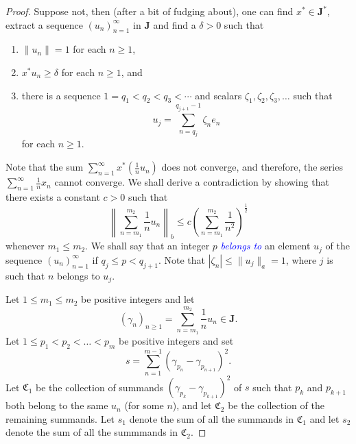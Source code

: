 \documentclass[11pt]{article}
\theoremstyle{thmstyle}
\theoremstyle{defstyle}
\newcommand{\define}[1]{\textcolor{blue}{\textit{#1}}}
\renewcommand{\le}{\leqslant}
\renewcommand{\ge}{\geqslant}
\newcommand{\bfJ}{\mathbf{J}}
\begin{document}
\begin{proof}
	Suppose not, then (after a bit of fudging about), one can find $x^\ast\in \bfJ^\ast$, extract a sequence $(u_n)_{n = 1}^\infty$ in $\bfJ$ and find a $\delta > 0$ such that 
	\begin{enumerate}[label=(\roman*)]
		\item $\|u_n\| = 1$ for each $n\ge 1$, 
		\item $x^\ast u_n\ge\delta$ for each $n\ge 1$, and 
		\item there is a sequence $1 = q_1 < q_2 < q_3 < \cdots$ and scalars $\zeta_1, \zeta_2, \zeta_3,\dots$ such that 
		\begin{equation*}
			u_j = \sum_{n = q_j}^{q_{j + 1} - 1}\zeta_n e_n
		\end{equation*}
		for each $n\ge 1$.
	\end{enumerate}
	Note that the sum $\displaystyle\sum_{n = 1}^\infty x^\ast\left(\frac{1}{n}u_n\right)$ does not converge, and therefore, the series $\displaystyle\sum_{n = 1}^\infty\frac{1}{n}x_n$ cannot converge. We shall derive a contradiction by showing that there exists a constant $c > 0$ such that 
	\begin{equation*}
		\left\|\sum_{n = m_1}^{m_2}\frac{1}{n}u_n\right\|_b\le c\left(\sum_{n = m_1}^{m_2}\frac{1}{n^2}\right)^{\frac{1}{2}}
	\end{equation*}
	whenever $m_1\le m_2$. We shall say that an integer $p$ \define{belongs to} an element $u_j$ of the sequence $(u_n)_{n = 1}^\infty$ if $q_j\le p < q_{j + 1}$. Note that $|\zeta_n|\le \|u_j\|_a = 1$, where $j$ is such that $n$ belongs to $u_j$. 

	Let $1\le m_1\le m_2$ be positive integers and let 
	\begin{equation*}
		(\gamma_n)_{n\ge 1} = \sum_{n = m_1}^{m_2}\frac{1}{n}u_n\in\bfJ.
	\end{equation*}
	Let $1\le p_1 < p_2 < \dots < p_m$ be positive integers and set 
	\begin{equation*}
		s = \sum_{n = 1}^{m - 1}\left(\gamma_{p_n} - \gamma_{p_{n + 1}}\right)^2.
	\end{equation*}
	Let $\mathfrak{C}_1$ be the collection of summands $(\gamma_{p_k} - \gamma_{p_{k + 1}})^2$ of $s$ such that $p_k$ and $p_{k + 1}$ both belong to the same $u_n$ (for some $n$), and let $\mathfrak{C}_2$ be the collection of the remaining summands. Let $s_1$ denote the sum of all the summands in $\mathfrak{C}_1$ and let $s_2$ denote the sum of all the summmands in $\mathfrak{C}_2$.


\end{proof}
\end{document}
